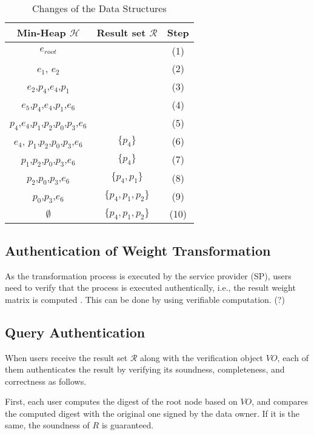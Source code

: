 \documentclass[10pt, conference, compsocconf]{IEEEtran}
\begin{document}
\begin{table}
	\begin{center}\scriptsize
		\begin{tabular}{ c |c| c}
			\hline
			Min-Heap $\mathcal{H}$ & Result set $\mathcal{R}$ & Step  \\
			\hline
			$e_{root}$ & & (1)\\
			$e_1$, $e_2$ & & (2) \\
			$e_2$,$p_4$,$e_4$,$p_1$ & & (3) \\
			$e_5$,$p_4$,$e_4$,$p_1$,$e_6$ & & (4)\\
			$p_4$,$e_4$,$p_1$,$p_2$,$p_0$,$p_3$,$e_6$ & & (5)\\
			$e_4$, $p_1$,$p_2$,$p_0$,$p_3$,$e_6$ & $\{p_4\}$ & (6) \\
			 $p_1$,$p_2$,$p_0$,$p_3$,$e_6$  & $\{p_4\}$ & (7)\\
			$p_2$,$p_0$,$p_3$,$e_6$ & $\{p_4,p_1\}$ & (8) \\
			$p_0$,$p_3$,$e_6$ & $\{p_4,p_1,p_2\}$ & (9)\\
			$\emptyset$ &  $\{p_4,p_1,p_2\}$ & (10)\\
			\hline
		\end{tabular}
	\end{center}
	\caption{Changes of the Data Structures}\label{ChangesoftheDataStructures}
\end{table}

\subsection{Authentication of Weight Transformation}

As the transformation process is executed by the service provider (SP), users need to verify that the process is executed authentically, i.e., the result weight matrix is computed . This can be done by using verifiable computation. (?)


\subsection{Query Authentication}\label{authentication}

When users receive the result set $\mathcal{R}$ along with the verification object $VO$, each of them authenticates the result by verifying its soundness, completeness, and correctness as follows.

First, each user computes the digest of the root node based on $VO$, and compares the computed digest with the original one signed by the data owner. If it is the same, the soundness of $R$ is guaranteed.
\end{document}
